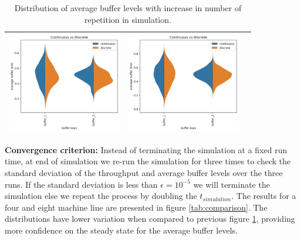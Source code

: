 \begin{table}[htbp]
\begin{tabular}{|p{5cm}|p{5cm}|p{5cm}|}
        \parbox[c]{5cm}{\centering \includegraphics[width = 5cm]{figures/transfer_3_37_100.png}} &
        \parbox[c]{5cm}{\centering \includegraphics[width = 5cm]{figures/transfer_3_37_1000.png}} \\
        \hline
    \end{tabular}
    \caption{Distribution of average buffer levels with increase in number of repetition in simulation.}
    \label{tab:constant_run_time}
\end{table}
\textbf{Convergence criterion:}  Instead of terminating the simulation at a fixed run time, at end of simulation we re-run the simulation for three times to check the standard deviation of the throughput and average buffer levels over the three runs. If the standard deviation is less than $\epsilon = 10^{-5}$ we will terminate the simulation else we repeat the process by doubling the $t_{simulation} $. The results for a four and eight machine line are presented in figure \ref{tab:comparison}. The distributions have lower variation when compared to previous figure \ref{tab:constant_run_time}, providing more confidence on the steady state for the average buffer levels.
